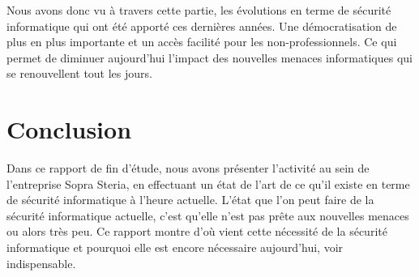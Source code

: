\documentclass[a4paper]{memoir}
\begin{document}
Nous avons donc vu à travers cette partie, les évolutions en terme de sécurité informatique qui ont été apporté ces dernières années. Une démocratisation de plus en plus importante et un accès facilité pour les non-professionnels. Ce qui permet de diminuer aujourd'hui l'impact des nouvelles menaces informatiques qui se renouvellent tout les jours. 



\chapter*{Conclusion}

Dans ce rapport de fin d'étude, nous avons présenter l'activité au sein de l'entreprise Sopra Steria, en effectuant un état de l'art de ce qu'il existe en terme de sécurité informatique à l'heure actuelle.
L'état que l'on peut faire de la sécurité informatique actuelle, c'est qu'elle n'est pas prête aux nouvelles menaces ou alors très peu. Ce rapport montre d'où vient cette nécessité de la sécurité informatique et pourquoi elle est encore nécessaire aujourd'hui, voir indispensable.
\end{document}
